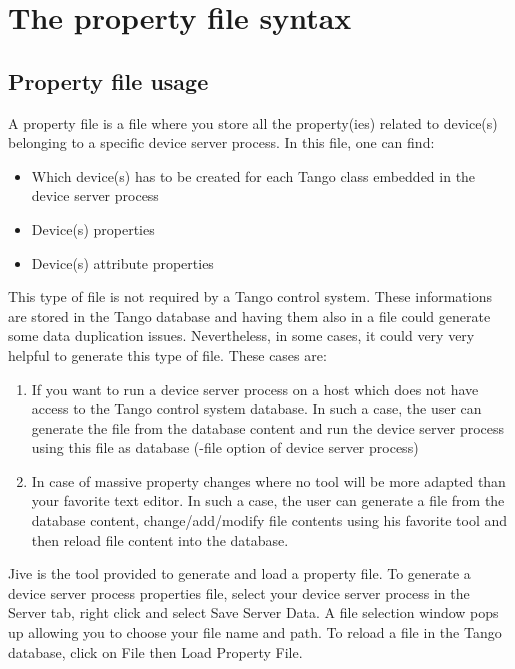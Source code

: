 
\chapter{The property file syntax}

\section{Property file usage}

A property file is a file where you store all the property(ies) related
to device(s) belonging to a specific device server process. In this
file, one can find:
\begin{itemize}
\item Which device(s) has to be created for each Tango class embedded in
the device server process
\item Device(s) properties
\item Device(s) attribute properties
\end{itemize}
This type of file is not required by a Tango control system. These
informations are stored in the Tango database and having them also
in a file could generate some data duplication issues. Nevertheless,
in some cases, it could very very helpful to generate this type of
file. These cases are:
\begin{enumerate}
\item If you want to run a device server process on a host which does not
have access to the Tango control system database. In such a case,
the user can generate the file from the database content and run the
device server process using this file as database (-file option of
device server process)
\item In case of massive property changes where no tool will be more adapted
than your favorite text editor. In such a case, the user can generate
a file from the database content, change/add/modify file contents
using his favorite tool and then reload file content into the database.
\end{enumerate}
Jive\cite{Jive doc} is the tool provided to generate and load a property
file. To generate a device server process properties file, select
your device server process in the \textquotedbl{}Server\textquotedbl{}
tab, right click and select \textquotedbl{}Save Server Data\textquotedbl{}.
A file selection window pops up allowing you to choose your file name
and path. To reload a file in the Tango database, click on \textquotedbl{}File\textquotedbl{}
then \textquotedbl{}Load Property File\textquotedbl{}. 

